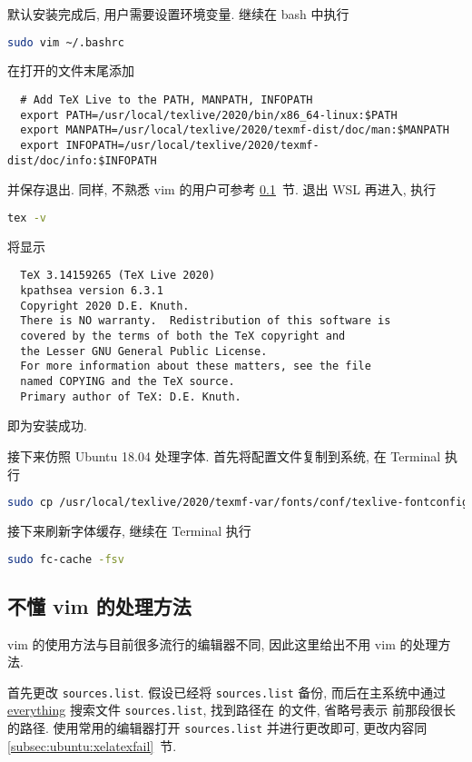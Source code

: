 默认安装完成后, 用户需要设置环境变量.
继续在 \textsf{bash} 中执行
\begin{lstlisting}[language = bash]
  sudo vim ~/.bashrc
\end{lstlisting}
在打开的文件末尾添加
\begin{lstlisting}
  # Add TeX Live to the PATH, MANPATH, INFOPATH
  export PATH=/usr/local/texlive/2020/bin/x86_64-linux:$PATH
  export MANPATH=/usr/local/texlive/2020/texmf-dist/doc/man:$MANPATH
  export INFOPATH=/usr/local/texlive/2020/texmf-dist/doc/info:$INFOPATH
\end{lstlisting}
并保存退出.
同样, 不熟悉 \textsf{vim} 的用户可参考 \ref{subsec:no-vim}~节.
退出 WSL 再进入, 执行
\begin{lstlisting}[language=bash]
  tex -v
\end{lstlisting}
将显示
\begin{lstlisting}
  TeX 3.14159265 (TeX Live 2020)
  kpathsea version 6.3.1
  Copyright 2020 D.E. Knuth.
  There is NO warranty.  Redistribution of this software is
  covered by the terms of both the TeX copyright and
  the Lesser GNU General Public License.
  For more information about these matters, see the file
  named COPYING and the TeX source.
  Primary author of TeX: D.E. Knuth.
\end{lstlisting}
即为安装成功.

接下来仿照 Ubuntu 18.04 处理字体.
首先将配置文件复制到系统,
在 \textsf{Terminal} 执行
\begin{lstlisting}[language=bash]
  sudo cp /usr/local/texlive/2020/texmf-var/fonts/conf/texlive-fontconfig.conf /etc/fonts/conf.d/09-texlive.conf
\end{lstlisting}
接下来刷新字体缓存,
继续在 \textsf{Terminal} 执行
\begin{lstlisting}[language=bash]
  sudo fc-cache -fsv
\end{lstlisting}

\subsection{不懂 \textsf{vim} 的处理方法}\label{subsec:no-vim}

\textsf{vim} 的使用方法与目前很多流行的编辑器不同,
因此这里给出不用 \textsf{vim} 的处理方法.

首先更改 \texttt{sources.list}.
假设已经将 \texttt{sources.list} 备份,
而后在主系统中通过 \href{https://www.voidtools.com/zh-cn/}{everything}
搜索文件 \texttt{sources.list},
找到路径在  的文件,
省略号表示  前那段很长的路径.
使用常用的编辑器打开 \texttt{sources.list} 并进行更改即可,
更改内容同 \ref{subsec:ubuntu:xelatexfail}~节.

